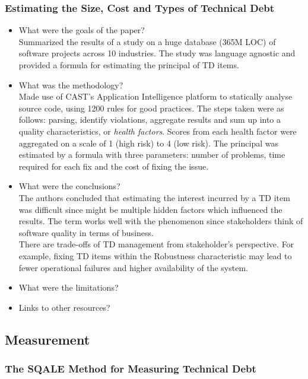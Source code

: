\documentclass{mprop}
\begin{document}
\subsubsection{Estimating the Size, Cost and Types of Technical Debt} \cite{Curtis2012}
\begin{itemize}
\item What were the goals of the paper? \\
Summarized the results of a study on a huge database (365M LOC) of software projects across 10 industries.
The study was language agnostic and provided a formula for estimating the principal of TD items.
\item What was the methodology? \\
Made use of CAST's Application Intelligence platform to statically analyse source code, using 1200 rules for good practices. 
The steps taken were as follows: parsing, identify violations, aggregate results and sum up into a quality characteristics, or \textit{health factors}.
Scores from each health factor were aggregated on a scale of 1 (high risk) to 4 (low risk).
The principal was estimated by a formula with three parameters: number of problems, time required for each fix and the cost of fixing the issue.
\item What were the conclusions? \\
The authors concluded that estimating the interest incurred by a TD item was difficult since might be multiple hidden factors which influenced the results.
The term works well with the phenomenon since stakeholders think of software quality in terms of business. \\
There are trade-offs of TD management from stakeholder's perspective. 
For example, fixing TD items within the Robustness characteristic may lead to fewer operational failures and higher availability of the system.
\item What were the limitations? \\
\item Links to other resources? \\
\end{itemize}

\subsection{Measurement}

\subsubsection{The SQALE Method for Measuring Technical Debt} \cite{Letouzey2012}
\end{document}
